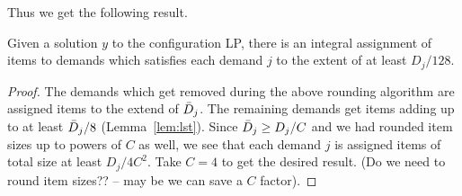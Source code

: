 Thus we get the following result.
\begin{theorem}
\label{thm:config}
Given a solution $y$ to the configuration LP, there is an integral assignment of items to demands which satisfies each demand $j$ to the extent of at least
$D_j/128$.
\end{theorem}
\begin{proof}
The demands which get removed during the above rounding algorithm are assigned items to the extend of ${\bar D}_j$. The remaining demands
get items adding up to at least ${\bar D}_j/8$ (Lemma~\ref{lem:lst}). Since ${\bar D}_j \geq D_j/C$ and we had rounded item sizes up to powers of $C$ as
well, we see that each demand $j$ is assigned items of total size at least $D_j/4C^2$. Take $C=4$ to get the desired result.
(Do we need to round item sizes?? -- may be we can save a $C$ factor).
\end{proof}
